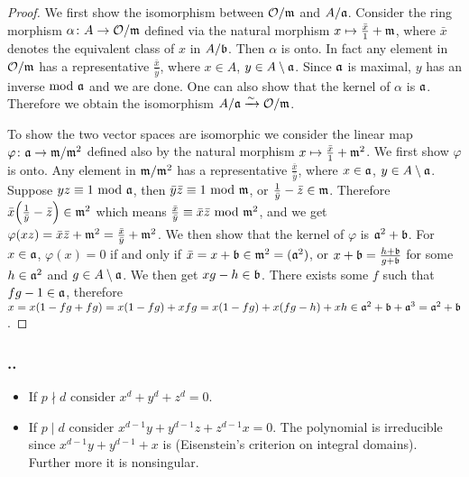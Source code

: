 \documentclass{note}
\newcounter{exercise}[section]
\newcommand{\Ex}{%
    \stepcounter{exercise}%
    \subsubsection*{\thesection.\arabic{exercise}.}%
}
\newcommand{\divides}{\mid}
\newcommand{\ndivide}{\nmid}
\begin{document}
\begin{proof}
  We first show the isomorphism between $\mathcal{O}/\mathfrak{m}$ and
  $A/\mathfrak{a}$. Consider the ring morphism $\alpha\colon A \to
    \mathcal{O}/\mathfrak{m}$ defined via the natural morphism $x \mapsto
    \frac{\bar{x}}{1}+\mathfrak{m}$, where $\bar{x}$ denotes the equivalent class of
  $x$ in $A/\mathfrak{b}$. Then $\alpha$ is onto. In fact any element in
  $\mathcal{O}/\mathfrak{m}$ has a representative $\frac{\bar{x}}{\bar{y}}$, where
  $x\in A$, $y \in A\setminus\mathfrak{a}$. Since $\mathfrak{a}$ is maximal, $y$ has an
  inverse $\!\mathop{}\mathrm{mod}\ \mathfrak{a}$ and we are done. One can also show that the kernel
  of $\alpha$ is $\mathfrak{a}$. Therefore we obtain the isomorphism $A/\mathfrak{a}
    \xrightarrow{\sim} \mathcal{O}/\mathfrak{m}$.

  To show the two vector spaces are isomorphic we consider the linear map
  $\varphi\colon \mathfrak{a} \to \mathfrak{m}/\mathfrak{m}^2$ defined also by the natural
  morphism $x\mapsto\frac{\bar{x}}{1}+\mathfrak{m}^2$. We first show $\varphi$ is
  onto. Any element in $\mathfrak{m}/\mathfrak{m}^2$ has a representative
  $\frac{\bar{x}}{\bar{y}}$, where $x \in \mathfrak{a}$, $y \in
    A\setminus\mathfrak{a}$. Suppose $yz \equiv 1 \mathop{}\mathrm{mod}\  \mathfrak{a}$, then
  $\bar{y}\bar{z} \equiv 1 \mathop{}\mathrm{mod}\  \mathfrak{m}$, or $\frac{1}{\bar{y}}-\bar{z} \in
    \mathfrak{m}$. Therefore $\bar{x}\left(\frac{1}{\bar{y}}-\bar{z}\right) \in
    \ideal{m}^2$ which means $\frac{\bar{x}}{\bar{y}} \equiv \bar{x}\bar{z} \mathop{}\mathrm{mod}\ 
    \mathfrak{m}^2$, and we get $\varphi(xz) = \bar{x}\bar{z}+\mathfrak{m}^2 =
    \frac{\bar{x}}{\bar{y}}+\mathfrak{m}^2$. We then show that the kernel of $\varphi$
  is $\mathfrak{a}^2+\mathfrak{b}$. For $x \in \mathfrak{a}$, $\varphi(x) = 0$ if and only
  if $\bar{x} = x+\mathfrak{b} \in \mathfrak{m}^2 = (\mathfrak{a}^2)$, or $x+\mathfrak{b} =
    \frac{h+\mathfrak{b}}{g+\mathfrak{b}}$ for some $h\in\mathfrak{a}^2$ and $g\in
    A\setminus\mathfrak{a}$. We then get $xg - h \in \mathfrak{b}$. There exists some $f$
  such that $fg-1\in \mathfrak{a}$, therefore $x = x(1-fg+fg) = x(1-fg) + xfg =
    x(1-fg) + x(fg - h) + xh \in \mathfrak{a}^2 + \mathfrak{b} + \mathfrak{a}^3 =
    \mathfrak{a}^2+\mathfrak{b}$.
\end{proof}



\setcounter{exercise}{4}

\Ex
\begin{itemize}
  \item If $p\ndivide d$ consider $x^d + y^d + z^d = 0$.
  \item If $p\divides d$ consider $x^{d-1}y + y^{d-1}z + z^{d-1}x = 0$. The polynomial
        is irreducible since $x^{d-1}y + y^{d-1} + x$ is (Eisenstein's criterion on
        integral domains). Further more it is nonsingular.
\end{itemize}
\end{document}
